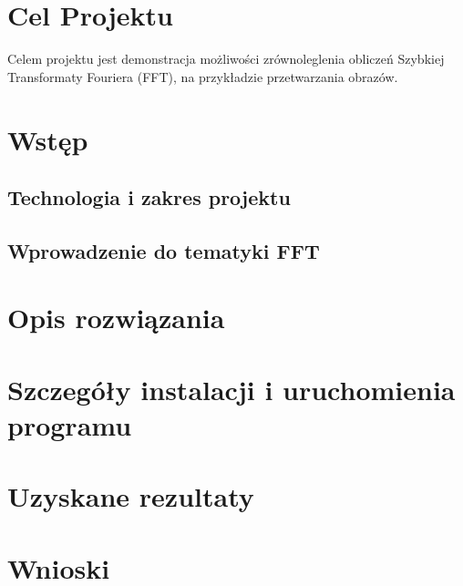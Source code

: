 \section{Cel Projektu}
Celem projektu jest demonstracja możliwości zrównoleglenia obliczeń Szybkiej Transformaty Fouriera (FFT), na przykładzie przetwarzania obrazów.
\section{Wstęp}
\subsection{Technologia i zakres projektu}
\subsection{Wprowadzenie do tematyki FFT}
\section{Opis rozwiązania}
\section{Szczegóły instalacji i uruchomienia programu}
\section{Uzyskane rezultaty}
\section{Wnioski}

